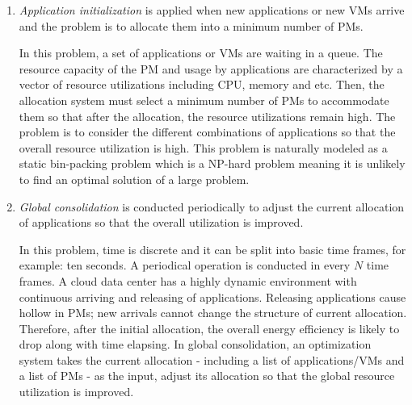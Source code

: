 \begin{enumerate}
	\item \emph{Application initialization} is applied when new applications or new VMs arrive and the problem is to allocate them into a minimum number of PMs.

	In this problem, a set of applications or VMs are waiting in a queue. The resource capacity of the PM and usage by applications are characterized by a vector of resource utilizations including CPU, memory and etc. Then, the allocation system must select a minimum number of PMs to accommodate them so that after the allocation, the resource utilizations remain high. The problem is to consider the different combinations of applications so that the overall resource utilization is high. This problem is naturally modeled as a static bin-packing problem \cite{CoffmanJr:1996ui} which is a NP-hard problem meaning it is unlikely to find an optimal solution of a large problem. 

	\item \emph{Global consolidation} is conducted periodically to adjust the current allocation of applications so that the overall utilization is improved.

	In this problem, time is discrete and it can be split into basic time frames, for example: ten seconds. A periodical operation is conducted in every $N$ time frames.
	A cloud data center has a highly dynamic environment with continuous arriving and releasing of applications. Releasing applications cause hollow in PMs; new arrivals cannot change the structure of current allocation. Therefore, after the initial allocation, the overall energy efficiency is likely to drop along with time elapsing. In global consolidation, an optimization system takes the current allocation - including a list of applications/VMs and a list of PMs -  as the input, adjust its allocation so that the global resource utilization is improved.


\end{enumerate}
